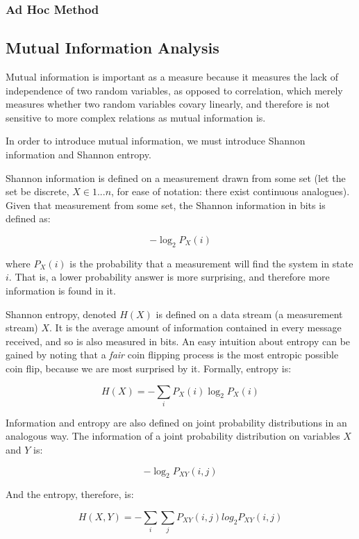 \documentclass[12pt]{article}
\begin{document}
\subsubsection{Ad Hoc Method}


\subsection{Mutual Information Analysis}

Mutual information is important as a measure because it measures the lack of independence of two random variables, as opposed to correlation, which merely measures whether two random variables covary linearly, and therefore is not sensitive to more complex relations as mutual information is.

In order to introduce mutual information, we must introduce Shannon information and Shannon entropy\cite{nnmi}.

Shannon information is defined on a measurement drawn from some set (let the set be discrete, $X \in {1 ... n}$, for ease of notation: there exist continuous analogues). Given that measurement from some set, the Shannon information in bits is defined as:

$$ -\log_2 P_X(i) $$

where $P_X(i)$ is the probability that a measurement will find the system in state $i$. That is, a lower probability answer is more surprising, and therefore more information is found in it.

Shannon entropy, denoted $H(X)$ is defined on a data stream (a measurement stream) $X$. It is the average amount of information contained in every message received, and so is also measured in bits. An easy intuition about entropy can be gained by noting that a \emph{fair} coin flipping process is the most entropic possible coin flip, because we are most surprised by it. Formally, entropy is:

$$H(X) = -\sum_i P_X(i) \log_2 P_X(i)$$

Information and entropy are also defined on joint probability distributions in an analogous way. The information of a joint probability distribution on variables $X$ and $Y$ is:

$$ -\log_2 P_{XY}(i, j) $$

And the entropy, therefore, is:

$$H(X, Y) = -\sum_i \sum_j P_{XY}(i, j) log_2 P_{XY}(i, j)$$
\end{document}
